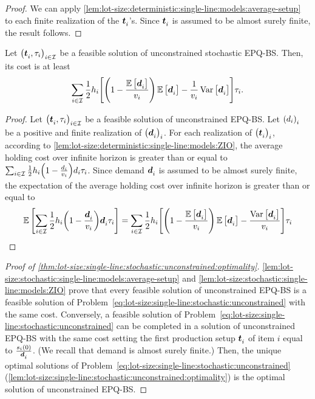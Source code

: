 \begin{proof}
We can apply \cref{lem:lot-size:deterministic:single-line:models:average-setup} to each finite realization of the $\va t_i$'s.
Since $\va t_i$ is assumed to be almost surely finite, the result follows.
\end{proof}



\begin{lem}\label{lem:lot-size:stochastic:single-line:models:ZIO}
Let $\bracket{\va t_i,\cover_i}_{i\in\REF}$ be a feasible solution of unconstrained stochastic EPQ-BS.
Then, its cost is at least
\begin{equation}
  \sum_{i\in\REF}\frac{1}{2}\holding_i\sqbracket{\bracket{1-\frac{\espe\sqbracket{\va\demand_i}}{\rate_i}}\espe\sqbracket{\va\demand_i} - \frac{1}{\rate_i}\vari\sqbracket{\va\demand_i}}\cover_i.
\end{equation}
\end{lem}


\begin{proof}
Let $\bracket{\va t_i,\cover_i}_{i\in\REF}$ be a feasible solution of unconstrained EPQ-BS.
Let $\bracket{\demand_i}_i$ be a positive and finite realization of $\bracket{\va\demand_i}_i$.
For each realization of $\bracket{\va t_i}_i$, according to \cref{lem:lot-size:deterministic:single-line:models:ZIO}, the average holding cost over infinite horizon is greater than or equal to 
$\sum_{i\in\REF}\frac{1}{2}\holding_i\bracket{1-\frac{\demand_i}{\rate_i}}\demand_i\cover_i$.
Since demand $\va\demand_i$ is assumed to be almost surely finite, the expectation of the average holding cost over infinite horizon is greater than or equal to 
\begin{equation}
  \espe\sqbracket{\sum_{i\in\REF}\frac{1}{2}\holding_i\bracket{1-\frac{\va\demand_i}{\rate_i}}\va\demand_i\cover_i}
  =
  \sum_{i\in\REF}\frac{1}{2}\holding_i\sqbracket{\bracket{1-\frac{\espe\sqbracket{\va\demand_i}}{\rate_i}}\espe\sqbracket{\va\demand_i} - \frac{\vari\sqbracket{\va\demand_i}}{\rate_i}}\cover_i
\end{equation}
\end{proof}



\begin{proof}[Proof of \cref{thm:lot-size:single-line:stochastic:unconstrained:optimality}]
\cref{lem:lot-size:stochastic:single-line:models:average-setup} and \cref{lem:lot-size:stochastic:single-line:models:ZIO} prove that every feasible solution of unconstrained EPQ-BS is a feasible solution of Problem~\eqref{eq:lot-size:single-line:stochastic:unconstrained} with the same cost.
Conversely, a feasible solution of Problem~\eqref{eq:lot-size:single-line:stochastic:unconstrained} can be completed in a solution of unconstrained EPQ-BS with the same cost setting the first production setup $\va t_i$ of item $i$ equal to $\frac{\inventory_i(0)}{\va\demand_i}$.
(We recall that demand is almost surely finite.)
Then, the unique optimal solutions of Problem~\eqref{eq:lot-size:single-line:stochastic:unconstrained} (\cref{lem:lot-size:single-line:stochastic:unconstrained:optimality}) is the optimal solution of unconstrained EPQ-BS.
\end{proof}




